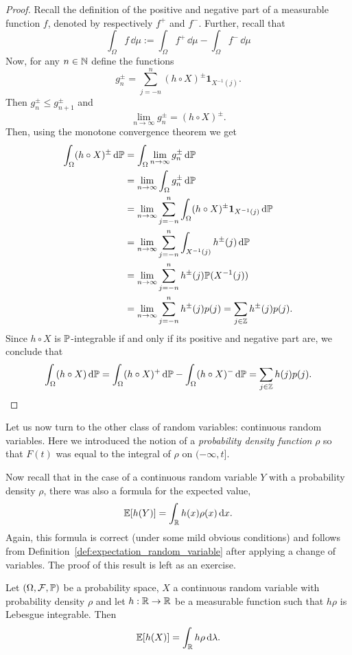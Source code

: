\begin{proof}
Recall the definition of the positive and negative part of a measurable function $f$, denoted by respectively $f^+$ and $f^-$. Further, recall that 
\[
	\int_\Omega f \, \dd \mu := \int_\Omega f^+ \, \dd \mu - \int_\Omega f^- \, \dd \mu 
\] 
Now, for any $n \in \mathbb N$ define the functions
\[
	g_n^\pm = \sum_{j = -n}^n (h \circ X)^\pm \mathbf{1}_{X^{-1}(j)}.
\]
Then $g_n^\pm \le g_{n+1}^\pm$ and
\[
	\lim_{n \to \infty} g_n^\pm = (h \circ X)^\pm.
\]
Then, using the monotone convergence theorem we get
\begin{align*}
	\int_\Omega (h \circ X)^\pm \, \mathrm{d} \mathbb P &= \int_\Omega \lim_{n \to \infty} g_n^\pm \, \mathrm{d} \mathbb P\\
	&= \lim_{n \to \infty} \int_\Omega g_n^\pm \, \mathrm{d} \mathbb P \\
	&= \lim_{n \to \infty} \sum_{j = -n}^n \int_\Omega (h \circ X)^\pm \mathbf{1}_{X^{-1}(j)} \, \mathrm{d} \mathbb P\\
	&= \lim_{n \to \infty} \sum_{j = -n}^n \int_{X^{-1}(j)} h^\pm(j) \, \mathrm{d} \mathbb P\\
	&= \lim_{n \to \infty} \sum_{j = -n}^n h^\pm(j) \mathbb P(X^{-1}(j)) \\
	&= \lim_{n \to \infty} \sum_{j = -n}^n h^\pm(j) p(j) = \sum_{j \in \mathbb Z} h^\pm(j) p(j).
\end{align*}
Since $h\circ X$ is $\mathbb P$-integrable if and only if its positive and negative part are, we conclude that
\[
	\int_\Omega (h \circ X) \, \mathrm{d} \mathbb P = \int_\Omega (h \circ X)^+ \, \mathrm{d} \mathbb P
	- \int_\Omega (h \circ X)^- \, \mathrm{d} \mathbb P = \sum_{j \in \mathbb Z} h(j) p(j).
\]
\end{proof}

Let us now turn to the other class of random variables: continuous random variables. Here we introduced the notion of a \emph{probability density function} $\rho$ so that $F(t)$ was equal to the integral of $\rho$ on $(-\infty,t]$. 

Now recall that in the case of a continuous random variable $Y$ with a probability density $\rho$, there was also a formula for the expected value,
\[
	\mathbb E[h(Y)] = \int_{\mathbb R} h(x) \rho(x) \, \mathrm{d} x.
\]
Again, this formula is correct (under some mild obvious conditions) and follows from Definition~\ref{def:expectation_random_variable} after applying a change of variables. The proof of this result is left as an exercise.

\begin{lemma}\label{lem:expectation_continuous_random_variable}
Let $(\Omega, \mathcal F, \mathbb{P})$ be a probability space, $X$ a continuous random variable with probability density $\rho$ and let $h : \mathbb R \to \mathbb R$ be a measurable function such that $h \rho$ is Lebesgue integrable. Then
\[
	\mathbb E[h(X)] = \int_{\mathbb R} h \rho \, \mathrm{d} \lambda.
\]
\end{lemma}

